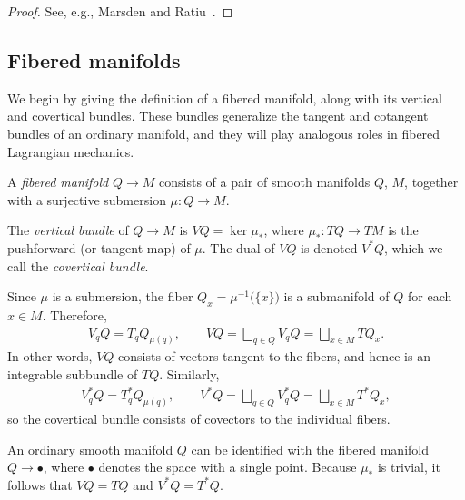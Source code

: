 \documentclass[10pt,a4paper]{amsart}
\numberwithin{equation}{section}
\begin{document}
\begin{proof}
 See, e.g., Marsden and Ratiu~\cite[Theorem~8.1.3]{MaRa1999}.
\end{proof}

\subsection{Fibered manifolds}\label{sec:fibered}

We begin by giving the def\/inition of a f\/ibered manifold, along with its vertical and covertical bundles. These bundles generalize the tangent and cotangent bundles of an ordinary manifold, and they will play analogous roles in f\/ibered Lagrangian mechanics.

\begin{Definition}
A \emph{fibered manifold} $ Q \rightarrow M $ consists of a pair of smooth manifolds $ Q $, $M$, together with a surjective submersion $ \mu \colon Q \rightarrow M $.
\end{Definition}

\begin{Definition}
The \emph{vertical bundle} of $ Q \rightarrow M $ is $ V Q = \ker \mu _\ast $, where $ \mu _\ast \colon T Q \rightarrow T M $ is the pushforward (or tangent map) of $\mu$. The dual of $ V Q $ is denoted $ V ^\ast Q $, which we call the \emph{covertical bundle}.
\end{Definition}

\begin{Remark} \label{rmk:disjoint}
Since $\mu$ is a submersion, the f\/iber $ Q _x = \mu ^{-1} \bigl( \{ x \} \bigr) $ is a submanifold of $Q$ for each $ x \in M $. Therefore,
 \begin{gather*}
 V _q Q = T _q Q _{\mu (q) } , \qquad V Q = \bigsqcup _{ q \in Q } V_q Q = \bigsqcup _{ x \in M } T Q _x .
 \end{gather*}
In other words, $ V Q $ consists of vectors tangent to the f\/ibers, and hence is an integrable subbundle of $ T Q $. Similarly,
\begin{gather*}
 V ^\ast_q Q = T ^\ast _q Q _{ \mu (q) } , \qquad V ^\ast Q = \bigsqcup _{ q \in Q } V _q ^\ast Q = \bigsqcup _{ x \in M } T ^\ast Q _x ,
 \end{gather*}
so the covertical bundle consists of covectors to the individual f\/ibers.
\end{Remark}

\begin{Example} An ordinary smooth manifold $Q$ can be identif\/ied with the f\/ibered manifold $ Q \rightarrow \bullet $, where $ \bullet $ denotes the space with a single point. Because $ \mu _\ast $ is trivial, it follows that $ V Q = T Q $ and $ V ^\ast Q = T ^\ast Q $.
\end{Example}
\end{document}
